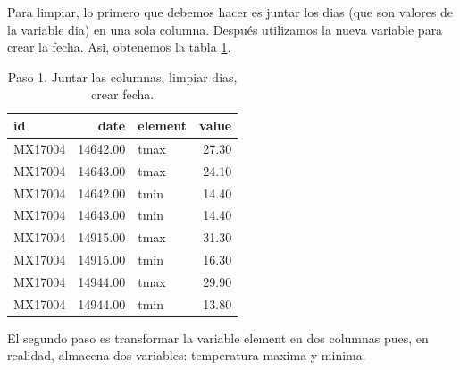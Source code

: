 \documentclass[]{article}
\newenvironment{Shaded}{\begin{snugshade}}{\end{snugshade}}
\newcommand{\KeywordTok}[1]{\textcolor[rgb]{0.13,0.29,0.53}{\textbf{{#1}}}}
\newcommand{\DataTypeTok}[1]{\textcolor[rgb]{0.13,0.29,0.53}{{#1}}}
\newcommand{\StringTok}[1]{\textcolor[rgb]{0.31,0.60,0.02}{{#1}}}
\newcommand{\CommentTok}[1]{\textcolor[rgb]{0.56,0.35,0.01}{\textit{{#1}}}}
\newcommand{\NormalTok}[1]{{#1}}
\begin{document}
Para limpiar, lo primero que debemos hacer es juntar los dias (que son
valores de la variable dia) en una sola columna. Después utilizamos la
nueva variable para crear la fecha. Asi, obtenemos la tabla
\ref{tab:clima1}.

\begin{Shaded}
\end{Shaded}

\begin{table}[ht]
\centering
\begin{tabular}{lrlr}
  \hline
id & date & element & value \\ 
  \hline
MX17004 & 14642.00 & tmax & 27.30 \\ 
  MX17004 & 14643.00 & tmax & 24.10 \\ 
  MX17004 & 14642.00 & tmin & 14.40 \\ 
  MX17004 & 14643.00 & tmin & 14.40 \\ 
  MX17004 & 14915.00 & tmax & 31.30 \\ 
  MX17004 & 14915.00 & tmin & 16.30 \\ 
  MX17004 & 14944.00 & tmax & 29.90 \\ 
  MX17004 & 14944.00 & tmin & 13.80 \\ 
   \hline
\end{tabular}
\caption{Paso 1. Juntar las columnas, limpiar dias, crear fecha.} 
\label{tab:clima1}
\end{table}

El segundo paso es transformar la variable element en dos columnas pues,
en realidad, almacena dos variables: temperatura maxima y minima.
\end{document}
